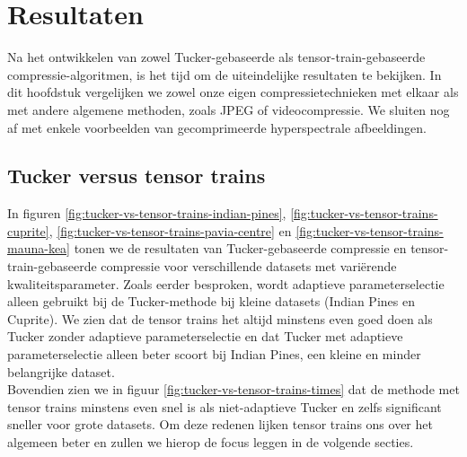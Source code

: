 \chapter{Resultaten}
\label{hoofdstuk:resultaten}

Na het ontwikkelen van zowel Tucker-gebaseerde als tensor-train-gebaseerde compressie-algoritmen, is het tijd om de uiteindelijke resultaten te bekijken. In dit hoofdstuk vergelijken we zowel onze eigen compressietechnieken met elkaar als met andere algemene methoden, zoals JPEG of videocompressie. We sluiten nog af met enkele voorbeelden van gecomprimeerde hyperspectrale afbeeldingen.

\section{Tucker versus tensor trains}

In figuren \ref{fig:tucker-vs-tensor-trains-indian-pines}, \ref{fig:tucker-vs-tensor-trains-cuprite}, \ref{fig:tucker-vs-tensor-trains-pavia-centre} en \ref{fig:tucker-vs-tensor-trains-mauna-kea} tonen we de resultaten van Tucker-gebaseerde compressie en tensor-train-gebaseerde compressie voor verschillende datasets met vari\"erende kwaliteitsparameter. Zoals eerder besproken, wordt adaptieve parameterselectie alleen gebruikt bij de Tucker-methode bij kleine datasets (Indian Pines en Cuprite). We zien dat de tensor trains het altijd minstens even goed doen als Tucker zonder adaptieve parameterselectie en dat Tucker met adaptieve parameterselectie alleen beter scoort bij Indian Pines, een kleine en minder belangrijke dataset.\\

Bovendien zien we in figuur \ref{fig:tucker-vs-tensor-trains-times} dat de methode met tensor trains minstens even snel is als niet-adaptieve Tucker en zelfs significant sneller voor grote datasets. Om deze redenen lijken tensor trains ons over het algemeen beter en zullen we hierop de focus leggen in de volgende secties.

